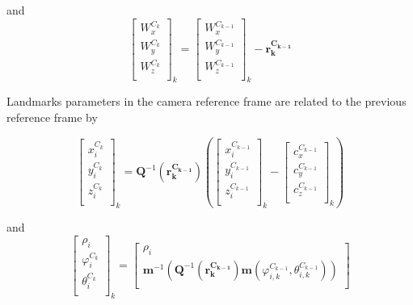 \noindent and
\begin{equation}
\begin{bmatrix}
W_{x}^{C_{k}} \\
W_{y}^{C_{k}} \\
W_{z}^{C_{k}} \\
\end{bmatrix}_{k}= \begin{bmatrix}
W_{x}^{C_{k-1}} \\
W_{y}^{C_{k-1}} \\
W_{z}^{C_{k-1}} \\
\end{bmatrix}_{k}-\mathbf{r_k^{C_{k-1}}}
\end{equation}
 
Landmarks parameters in the camera reference frame are related to the
previous reference frame 
by

\begin{equation}
\begin{bmatrix}
x_{i}^{C_{k}} \\
y_{i}^{C_{k}} \\
z_{i}^{C_{k}} \\
\end{bmatrix}_{k}=\mathbf{Q}^{-1}(\mathbf{r_k^{C_{k-1}}})\left(
\begin{bmatrix}
x_{i}^{C_{k-1}} \\
y_{i}^{C_{k-1}} \\
z_{i}^{C_{k-1}} \\
\end{bmatrix}_{k}- \begin{bmatrix}
c_{x}^{C_{k-1}} \\
c_{y}^{C_{k-1}} \\
c_{z}^{C_{k-1}} \\
\end{bmatrix}_{k}\right)
\end{equation}

\noindent and
\begin{equation}
\begin{bmatrix}
\rho_{i} \\
\varphi_{i}^{C_{k}} \\
\theta_{i}^{C_{k}} \\
\end{bmatrix}_{k}=
\begin{bmatrix}
\rho _{i} \\
\mathbf{m}^{-1}\left(\mathbf{Q}^{-1}(\mathbf{r_k^{C_{k-1}}})\mathbf{m}(\varphi _{i, k}^{C_{k-1}}, \theta _{i, k}^{C_{k-1}})\right) \\
\end{bmatrix}
\end{equation}

